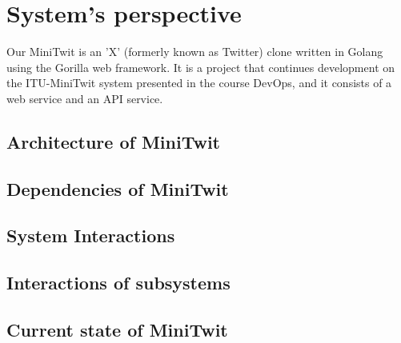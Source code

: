 \section{System's perspective}
Our MiniTwit is an 'X' (formerly known as Twitter) clone written in Golang using the Gorilla web framework. It is a project that continues development on the ITU-MiniTwit system presented in the course DevOps, and it consists of a web service and an API service. 

\subsection{Architecture of MiniTwit}


\subsection{Dependencies of MiniTwit}


\subsection{System Interactions}


\subsection{Interactions of subsystems}


\subsection{Current state of MiniTwit}
